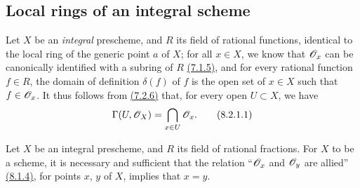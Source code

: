 \subsection{Local rings of an integral scheme}
\label{subsection-local-rings-of-integral-scheme}

\begin{env}[8.2.1]
\label{env-1.8.2.1}
Let $X$ be an {\em integral} prescheme, and $R$ its field of
rational functions, identical to the local ring of the generic point $a$ of $X$;
for all $x\in X$, we know that $\mathscr{O}_x$ can be canonically identified with a
subring of $R$ \hyperref[env-1.7.1.5]{(7.1.5)}, and for every rational function $f\in R$, the
domain of definition $\delta(f)$ of $f$ is the open set of $x\in X$ such that
$f\in\mathscr{O}_x$. It thus follows from \hyperref[env-1.7.2.6]{(7.2.6)} that, for every open $U\subset X$,
we have
\[
  \Gamma(U,\mathscr{O}_X)=\bigcap_{x\in U}\mathscr{O}_x.
  \tag{8.2.1.1}
\]
\end{env}

\begin{prop}[8.2.2]
\label{prop-1.8.2.2}
Let $X$ be an integral prescheme,
and $R$ its field of rational fractions. For $X$ to be a scheme, it is
necessary and sufficient that the relation ``$\mathscr{O}_x$ and $\mathscr{O}_y$ are allied''
\hyperref[lem-1.8.1.4]{(8.1.4)}, for points $x$, $y$ of $X$, implies that $x=y$.
\end{prop}

